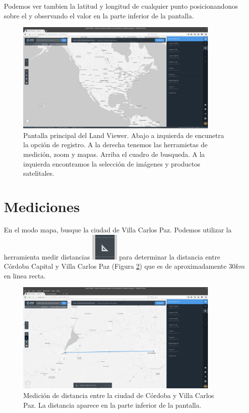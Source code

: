 \documentclass[a4paper,12pt]{book}
\begin{document}
Podemos ver tambien la latitud y longitud de cualquier punto posicionandonos sobre el y observando el valor en la parte inferior de la pantalla.

\begin{figure}[h!]
    \centering
    \includegraphics[width=0.9\textwidth]{fig:main.png}
    \caption{Pantalla principal del Land Viewer. Abajo a izquierda de encunetra la opción de registro. A la derecha tenemos las herramietas de medición, zoom y mapas. Arriba el cuadro de busqueda. A la izquierda encontramos la selección de imágenes y productos satelitales.}
    \label{fig:main}
\end{figure}


\section{Mediciones}

En el modo mapa, busque la ciudad de Villa Carlos Paz. Podemos utilizar la herramienta medir distancias \includegraphics[scale=0.2]{in:medir.png} para determinar la distancia entre Córdoba Capital y Villa Carlos Paz (Figura \ref{fig:distancia}) que es de aproximadamente $30km$ en linea recta.

\begin{figure}[!h]
    \centering
    \includegraphics[width=0.9\textwidth]{fig:distancia.png}
    \caption{Medición de distancia entre la ciudad de Córdoba y Villa Carlos Paz. La distancia aparece en la parte inferior de la pantalla.}
    \label{fig:distancia}
\end{figure}
\end{document}
